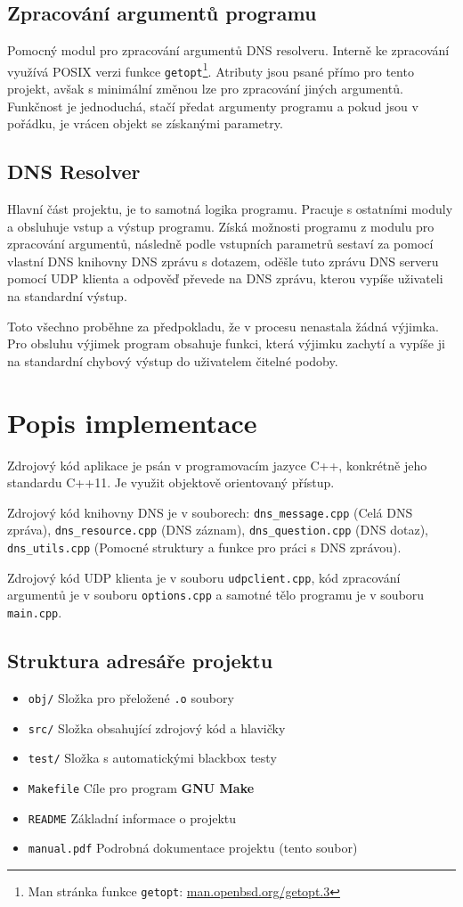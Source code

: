 \documentclass[a4paper,12pt]{article}
\begin{document}
\subsection{Zpracování argumentů programu}
Pomocný modul pro zpracování argumentů DNS resolveru. Interně ke zpracování využívá POSIX verzi funkce \texttt{getopt}\footnote{Man stránka funkce \texttt{getopt}: \url{man.openbsd.org/getopt.3}}. Atributy jsou psané přímo pro tento projekt, avšak s minimální změnou lze pro zpracování jiných argumentů. 
Funkčnost je jednoduchá, stačí předat argumenty programu a pokud jsou v pořádku, je vrácen objekt se získanými parametry.

\subsection{DNS Resolver}
Hlavní část projektu, je to samotná logika programu. Pracuje s ostatními moduly a obsluhuje vstup a výstup programu. Získá možnosti programu z modulu pro zpracování argumentů, následně podle vstupních parametrů sestaví za pomocí vlastní DNS knihovny DNS zprávu s dotazem, oděšle tuto zprávu DNS serveru pomocí UDP klienta a odpověď převede na DNS zprávu, kterou vypíše uživateli na standardní výstup. 

Toto všechno proběhne za předpokladu, že v procesu nenastala žádná výjimka. Pro obsluhu výjimek program obsahuje funkci, která výjimku zachytí a vypíše ji na standardní chybový výstup do uživatelem čitelné podoby.

\section{Popis implementace}
Zdrojový kód aplikace je psán v programovacím jazyce C++, konkrétně jeho standardu C++11. 
Je využit objektově orientovaný přístup.

Zdrojový kód knihovny DNS je v souborech: \texttt{dns\_message.cpp} (Celá DNS zpráva), \texttt{dns\_resource.cpp} (DNS záznam), \texttt{dns\_question.cpp} (DNS dotaz), \texttt{dns\_utils.cpp} (Pomocné struktury a funkce pro práci s DNS zprávou).

Zdrojový kód UDP klienta je v souboru \texttt{udpclient.cpp}, kód zpracování argumentů je v souboru \texttt{options.cpp} a samotné tělo programu je v souboru \texttt{main.cpp}.

\subsection{Struktura adresáře projektu}
\begin{itemize}
\item \texttt{obj/} \quad Složka pro přeložené \texttt{.o} soubory
\item \texttt{src/} \quad Složka obsahující zdrojový kód a hlavičky
\item \texttt{test/} \quad Složka s automatickými blackbox testy
\item \texttt{Makefile} \quad Cíle pro program \textbf{GNU Make}
\item \texttt{README} \quad Základní informace o projektu
\item \texttt{manual.pdf} \quad Podrobná dokumentace projektu (tento soubor)
\end{itemize}
\end{document}
